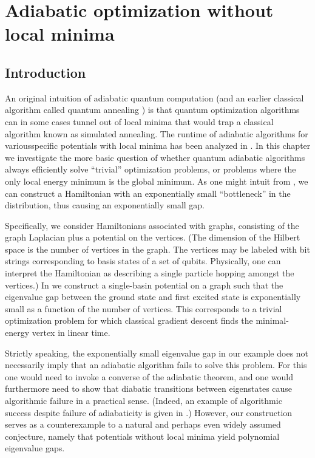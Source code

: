 \chapter{Adiabatic optimization without local minima}

\section{Introduction}

An original intuition of adiabatic quantum computation
(and an earlier classical algorithm called quantum annealing
\cite{FGSSD94}) is that quantum optimization algorithms can in some
cases tunnel out of local minima that would trap a classical algorithm known as simulated annealing. The runtime of adiabatic algorithms for variousspecific potentials with local minima has been analyzed in \cite{R04,
  DMV01, FGG02, VDV03, aminchoi, Amin}. In this chapter we investigate the more basic
question of whether quantum adiabatic algorithms always
efficiently solve ``trivial'' optimization problems, or problems where the only local energy minimum is the global minimum. As one might intuit from , we can construct a Hamiltonian with an exponentially small ``bottleneck'' in the distribution, thus causing an exponentially small gap.

Specifically, we consider Hamiltonians associated with graphs,
consisting of the graph Laplacian plus a potential on the
vertices. (The dimension of the Hilbert space is the number of
vertices in the graph. The vertices may be labeled with bit strings
corresponding to basis states of a set of
qubits. Physically, one can interpret the Hamiltonian
as describing a single particle hopping amongst the vertices.) In
 we construct a single-basin potential on a graph
such that the eigenvalue gap between the ground state and first
excited state is exponentially small as a function of the number of
vertices. This corresponds to a trivial optimization problem for which
classical gradient descent finds the minimal-energy vertex in linear
time.

Strictly speaking, the exponentially small eigenvalue gap in our
example does not necessarily imply that an adiabatic algorithm fails
to solve this problem. For this one would need to invoke a converse of
the adiabatic theorem, and one would furthermore need to show that
diabatic transitions between eigenstates cause algorithmic failure in
a practical sense. (Indeed, an example of algorithmic success despite
failure of adiabaticity is given in \cite{NSK12}.) However, our
construction serves as a counterexample to a natural and perhaps even
widely assumed conjecture, namely that potentials without local
minima yield polynomial eigenvalue gaps. 

